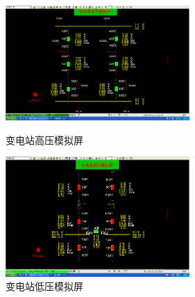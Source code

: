 \documentclass[a4paper]{ctexrep}
\begin{document}
                    \begin{figure}[htbp]
                        \centering
                        \begin{minipage}[t]{0.48\textwidth}
                            \centering
                            \includegraphics[width=7cm]{9.png}
                            \caption{变电站高压模拟屏}
                        \end{minipage} 
                        \begin{minipage}[t]{0.48\textwidth}
                            \centering
                            \includegraphics[width=7cm]{10.png}
                            \caption{变电站低压模拟屏}
                        \end{minipage}
                    \end{figure}
\end{document}
